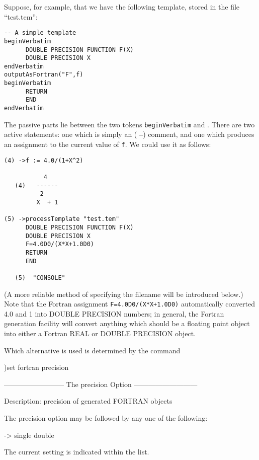 Suppose, for example, that we have the following template, stored in
the file ``test.tem'':
\begin{verbatim}
-- A simple template
beginVerbatim
      DOUBLE PRECISION FUNCTION F(X)
      DOUBLE PRECISION X
endVerbatim
outputAsFortran("F",f)
beginVerbatim
      RETURN
      END
endVerbatim
\end{verbatim}
The passive parts lie between the two
tokens {\tt beginVerbatim} and .  There
are two active statements: one which is simply an \Language{} (
{\tt --})
comment, and one which produces an assignment to the current value
of {\tt f}.  We could use it as follows:
\begin{verbatim}
(4) ->f := 4.0/(1+X^2)

           4
   (4)   ------
          2
         X  + 1

(5) ->processTemplate "test.tem"
      DOUBLE PRECISION FUNCTION F(X)
      DOUBLE PRECISION X
      F=4.0D0/(X*X+1.0D0)
      RETURN
      END

   (5)  "CONSOLE"
\end{verbatim}

(A more reliable method of specifying the filename will be introduced
below.)  Note that the Fortran assignment {\tt F=4.0D0/(X*X+1.0D0)}
automatically converted 4.0 and 1 into DOUBLE PRECISION numbers; in
general, the \Language{} Fortran generation facility will convert
anything which should be a floating point object into either
a Fortran REAL or DOUBLE PRECISION object.
\begin{noOutputXtc}
\begin{xtccomment}
Which alternative is used is determined by the command
\end{xtccomment}
\begin{spadsrc}
)set fortran precision
\end{spadsrc}
\begin{SysCmdOutput}
-------------------------- The precision Option ---------------------------

 Description: precision of generated FORTRAN objects

 The precision option may be followed by any one of the following:

 -> single 
    double

 The current setting is indicated within the list.

\end{SysCmdOutput}
\end{noOutputXtc}

